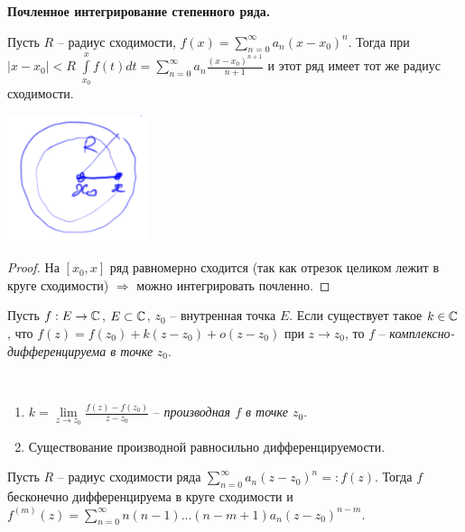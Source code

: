 \begin{theorem}
    \textbf{Почленное интегрирование степенного ряда.}

    Пусть $R$ – радиус сходимости, $f(x)=\sum\limits_{n=0}^\infty a_n(x-x_0)^n$. Тогда при $|x-x_0|<R$ $\int\limits_{x_0}^xf(t)dt=\sum\limits_{n=0}^\infty a_n\frac{(x-x_0)^{n+1}}{n+1}$ и этот ряд имеет тот же радиус сходимости.

    \includegraphics[width=0.2\linewidth]{images/10-05-4.png}
\end{theorem}

\begin{proof}
    На $[x_0, x]$ ряд равномерно сходится (так как отрезок целиком лежит в круге сходимости) $\Rightarrow$ можно интегрировать почленно.
\end{proof}

\begin{definition}
    Пусть $f: E\rightarrow \mathbb{C}$,  $E\subset \mathbb{C}$, $z_0$ – внутренная точка $E$. Если существует такое $k\in \mathbb{C}$, что $f(z)=f(z_0)+k(z-z_0)+o(z-z_0)$ при $z\rightarrow z_0$, то $f$ – \textit{комплексно-дифференцируема в точке} $z_0$.
\end{definition}

\begin{remark}~
    \begin{enumerate}
        \item $k=\lim\limits_{z\rightarrow z_0}\frac{f(z)-f(z_0)}{z-z_0}$ – \textit{производная $f$ в точке $z_0$}.
        \item Существование производной равносильно дифференцируемости.
    \end{enumerate}
\end{remark}

\begin{theorem}
    Пусть $R$ – радиус сходимости ряда $\sum\limits_{n=0}^\infty a_n(z-z_0)^n=:f(z)$. Тогда $f$ бесконечно дифференцируема в круге сходимости и $f^{(m)}(z)=\sum\limits_{n=0}^\infty n(n-1)...(n-m+1)a_n(z-z_0)^{n-m}$.
\end{theorem}

